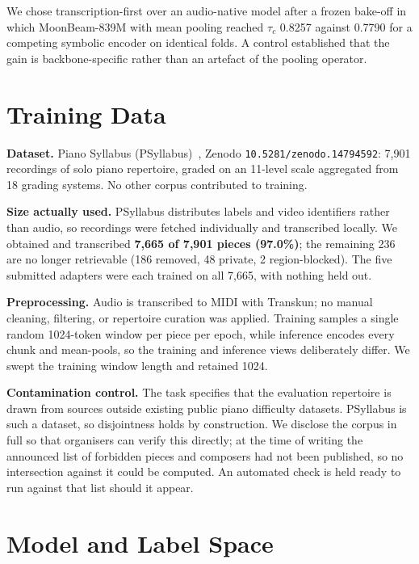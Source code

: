 \documentclass{article}
\begin{document}
We chose transcription-first over an audio-native model after a frozen
bake-off in which MoonBeam-839M with mean pooling reached $\tau_c$ 0.8257
against 0.7790 for a competing symbolic encoder on identical folds. A control
established that the gain is backbone-specific rather than an artefact of the
pooling operator.

\section{Training Data}\label{sec:data}

\textbf{Dataset.} Piano Syllabus
(PSyllabus)~\cite{ramoneda2025audio,psyllabus2025dataset}, Zenodo
\texttt{10.5281/zenodo.14794592}: 7{,}901 recordings of solo piano repertoire,
graded on an 11-level scale aggregated from 18 grading systems. No other corpus
contributed to training.

\textbf{Size actually used.} PSyllabus distributes labels and video identifiers
rather than audio, so recordings were fetched individually and transcribed
locally. We obtained and transcribed \textbf{7{,}665 of 7{,}901 pieces
(97.0\%)}; the remaining 236 are no longer retrievable (186 removed, 48
private, 2 region-blocked). The five submitted adapters were each trained on
all 7{,}665, with nothing held out.

\textbf{Preprocessing.} Audio is transcribed to MIDI with Transkun; no manual
cleaning, filtering, or repertoire curation was applied. Training samples a
single random 1024-token window per piece per epoch, while inference encodes
every chunk and mean-pools, so the training and inference views deliberately
differ. We swept the training window length and retained 1024.

\textbf{Contamination control.} The task specifies that the evaluation
repertoire is drawn from sources outside existing public piano difficulty
datasets. PSyllabus is such a dataset, so disjointness holds by construction.
We disclose the corpus in full so that organisers can verify this directly; at
the time of writing the announced list of forbidden pieces and composers had
not been published, so no intersection against it could be computed. An
automated check is held ready to run against that list should it appear.

\section{Model and Label Space}\label{sec:model}
\end{document}
